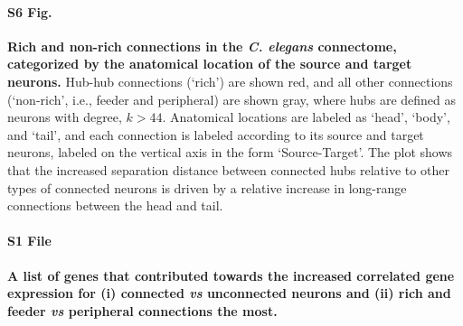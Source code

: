 \documentclass[10pt,letterpaper]{article}
\begin{document}
\paragraph*{S6 Fig.}
\label{S6_Fig}
{\bf Rich and non-rich connections in the \emph{C. elegans} connectome, categorized by the  anatomical location of the source and target neurons.}
   Hub-hub connections (`rich') are shown red, and all other connections (`non-rich', i.e., feeder and peripheral) are shown gray, where hubs are defined as neurons with degree, $k > 44$.
Anatomical locations are labeled as `head', `body', and `tail', and each connection is labeled according to its source and target neurons, labeled on the vertical axis in the form `Source-Target'.
The plot shows that the increased separation distance between connected hubs relative to other types of connected neurons is driven by a relative increase in long-range connections between the head and tail.

\paragraph*{S1 File}
\label{file:geneList}
{\bf A list of genes that contributed towards the increased correlated gene expression for (i) connected \textit{vs} unconnected neurons and (ii) rich and feeder \textit{vs} peripheral connections the most.} 
\end{document}

